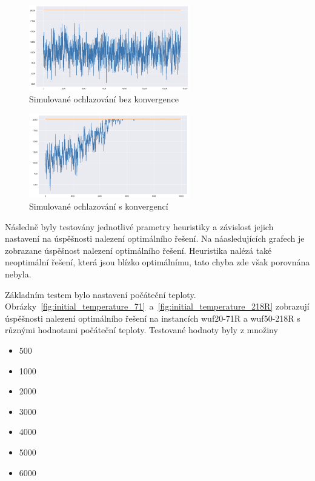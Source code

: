 \documentclass[twoside,twocolumn]{article}
\begin{document}
    \begin{figure}
        \centering
        \includegraphics[width=7cm]{images/no-convergence}
        \caption{Simulované ochlazování bez konvergence}
        \label{fig:no-convergence}
    \end{figure}

    \begin{figure}
        \centering
        \includegraphics[width=7cm]{images/convergence}
        \caption{Simulované ochlazování s konvergencí}
        \label{fig:convergence}
    \end{figure}

    Následně byly testovány jednotlivé prametry heuristiky a závislost jejich nastavení na úspěšnosti nalezení optimálního řešení.
    Na náasledujících grafech je zobrazane úspěšnost nalezení optimálního řešení.
    Heuristika nalézá také neoptimální řešení, která jsou blízko optimálnímu, tato chyba zde však porovnána nebyla.

    Základním testem bylo nastavení počáteční teploty.
    Obrázky~\ref{fig:initial_temperature_71}~a~\ref{fig:initial_temperature_218R} zobrazují úspěšnosti nalezení optimálního řešení
    na instancích wuf20-71R a wuf50-218R s různými hodnotami počáteční teploty.
    Testované hodnoty byly z množiny

    \begin{itemize}
        \item 500
        \item 1000
        \item 2000
        \item 3000
        \item 4000
        \item 5000
        \item 6000
    \end{itemize}
\end{document}
